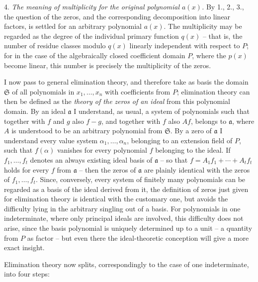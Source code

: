 \documentclass[11pt]{article}
\begin{document}
4. \emph{The meaning of multiplicity for the original polynomial $a(x)$.} By 1., 2., 3., the question of the zeros, and the corresponding decomposition into linear factors, is settled for an arbitrary polynomial $a(x)$. The multiplicity may be regarded as the degree of the individual primary function $q(x)$ -- that is, the number of residue classes modulo $q(x)$ linearly independent with respect to $P$; for in the case of the algebraically closed coefficient domain $P$, where the $p(x)$ become linear, this number is precisely the multiplicity of the zeros.

I now pass to general elimination theory, and therefore take as basis the domain $\mathfrak S$ of all polynomials in $x_1,\ldots,x_n$ with coefficients from $P$; elimination theory can then be defined as the \emph{theory of the zeros of an ideal} from this polynomial domain. By an ideal $\mathfrak a$ I understand, as usual, a system of polynomials such that together with $f$ and $g$ also $f-g$, and together with $f$ also $Af$, belongs to $\mathfrak a$, where $A$ is understood to be an arbitrary polynomial from $\mathfrak S$. By a zero of $\mathfrak a$ I understand every value system $\alpha_1,\ldots,\alpha_n$, belonging to an extension field of $P$, such that $f(\alpha)$ vanishes for every polynomial $f$ belonging to the ideal. If $f_1,\ldots,f_t$ denotes an always existing ideal basis of $\mathfrak a$ -- so that $f=A_1f_1+\cdots+A_tf_t$ holds for every $f$ from $\mathfrak a$ -- then the zeros of $\mathfrak a$ are plainly identical with the zeros of $f_1,\ldots,f_t$. Since, conversely, every system of finitely many polynomials can be regarded as a basis of the ideal derived from it, the definition of zeros just given for elimination theory is identical with the customary one, but avoids the difficulty lying in the arbitrary singling out of a basis. For polynomials in one indeterminate, where only principal ideals are involved, this difficulty does not arise, since the basis polynomial is uniquely determined up to a unit -- a quantity from $P$ as factor -- but even there the ideal-theoretic conception will give a more exact insight.

Elimination theory now splits, correspondingly to the case of one indeterminate, into four steps:
\end{document}
